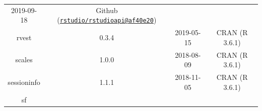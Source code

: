 \documentclass[11pt,]{book}
\begin{document}
\begin{longtable}[]{@{}cccc@{}}
\begin{minipage}[t]{0.16\columnwidth}
2019-09-18\strut
\end{minipage} & \begin{minipage}[t]{0.36\columnwidth}\centering\strut
Github
(\href{mailto:rstudio/rstudioapi@af40e20}{\nolinkurl{rstudio/rstudioapi@af40e20}})\strut
\end{minipage}\tabularnewline
\begin{minipage}[t]{0.18\columnwidth}\centering\strut
rvest\strut
\end{minipage} & \begin{minipage}[t]{0.19\columnwidth}\centering\strut
0.3.4\strut
\end{minipage} & \begin{minipage}[t]{0.16\columnwidth}\centering\strut
2019-05-15\strut
\end{minipage} & \begin{minipage}[t]{0.36\columnwidth}\centering\strut
CRAN (R 3.6.1)\strut
\end{minipage}\tabularnewline
\begin{minipage}[t]{0.18\columnwidth}\centering\strut
scales\strut
\end{minipage} & \begin{minipage}[t]{0.19\columnwidth}\centering\strut
1.0.0\strut
\end{minipage} & \begin{minipage}[t]{0.16\columnwidth}\centering\strut
2018-08-09\strut
\end{minipage} & \begin{minipage}[t]{0.36\columnwidth}\centering\strut
CRAN (R 3.6.1)\strut
\end{minipage}\tabularnewline
\begin{minipage}[t]{0.18\columnwidth}\centering\strut
sessioninfo\strut
\end{minipage} & \begin{minipage}[t]{0.19\columnwidth}\centering\strut
1.1.1\strut
\end{minipage} & \begin{minipage}[t]{0.16\columnwidth}\centering\strut
2018-11-05\strut
\end{minipage} & \begin{minipage}[t]{0.36\columnwidth}\centering\strut
CRAN (R 3.6.1)\strut
\end{minipage}\tabularnewline
\begin{minipage}[t]{0.18\columnwidth}\centering\strut
sf\strut
\end{minipage} & \begin{minipage}[t]{0.19\columnwidth}\centering\strut

\end{minipage}
\end{longtable}
\end{document}
